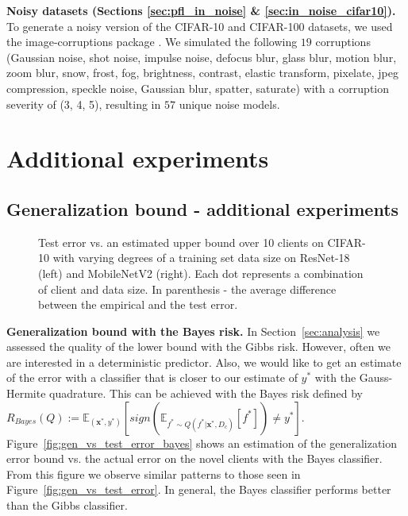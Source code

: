 \documentclass{article}
\def\Figref#1{Figure~\ref{#1}}
\def\Secref#1{Section~\ref{#1}}
\def\rvx{{\mathbf{x}}}
\newcommand{\E}{\mathbb{E}}
\begin{document}
\textbf{Noisy datasets (Sections \ref{sec:pfl_in_noise} \& \ref{sec:in_noise_cifar10}).} To generate a noisy version of the CIFAR-10 and CIFAR-100 datasets, we used the image-corruptions package \cite{hendrycks2018benchmarking}. We simulated the following $19$ corruptions (Gaussian noise, shot noise, impulse noise, defocus blur, glass blur, motion blur, zoom blur, snow, frost, fog,
brightness, contrast, elastic transform, pixelate, jpeg compression,
speckle noise, Gaussian blur, spatter, saturate) with a corruption severity of (3, 4, 5), resulting in $57$ unique noise models.

\section{Additional experiments} \label{sec:additional_exp}

\subsection{Generalization bound - additional experiments}


\begin{figure}[!t]
\centering
    \begin{subfigure}[ResNet-18]{
    \texttt{[image: figures/gibbs\_emp\_vs\_test\_error\_resnet.png]}
    }
    \end{subfigure}
\begin{subfigure}[MobileNetV2]{
    \texttt{[image: figures/gibbs\_emp\_vs\_test\_error\_mobilenet.png]}
    }
     \end{subfigure}
    \caption{Test error vs. an estimated upper bound over 10 clients on CIFAR-10 with varying degrees of a training set data size on ResNet-18 (left) and MobileNetV2 (right). Each dot represents a combination of client and data size. In parenthesis - the average difference between the empirical and the test error.}
    \label{fig:bound_larger_networks}
\end{figure}
\textbf{Generalization bound with the Bayes risk.} In \Secref{sec:analysis} we assessed the quality of the lower bound with the Gibbs risk. However, often we are interested in a deterministic predictor. Also, we would like to get an estimate of the error with a classifier that is closer to our estimate of $y^*$ with the Gauss-Hermite quadrature. This can be achieved with the Bayes risk \cite{reeb2018learning} defined by $R_{Bayes}(Q) := \E_{(\rvx^*, y^*)}[sign\left( \E_{f^* \sim Q(f^* | \rvx^*, D_c)}[f^*] \right)\neq y^*]$. \Figref{fig:gen_vs_test_error_bayes} shows an estimation of the generalization error bound vs. the actual error on the novel clients with the Bayes classifier. From this figure we observe similar patterns to those seen in \Figref{fig:gen_vs_test_error}. In general, the Bayes classifier performs better than the Gibbs classifier.
\end{document}
